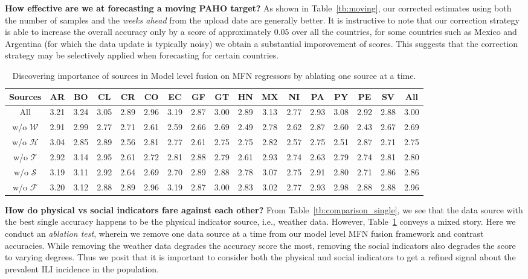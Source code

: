 {\noindent \textbf{How effective are we at forecasting a moving PAHO target?}} 
As shown in Table~\ref{tb:moving}, 
our
corrected estimates 
using both the number of samples and 
the {\it weeks ahead} from the upload date are generally better. It is instructive to note that
our correction strategy is
able to increase the overall accuracy only by a score of approximately 0.05 over all the countries, 
for some countries such as Mexico and Argentina (for which the data update is typically noisy) we obtain 
a substantial imporovement of scores. This suggests that the correction strategy may be selectively applied 
when forecasting for certain countries. 


\begin{table}[tb!]
  \scriptsize
  \centering
  \caption{\label{tb:Ablation} Discovering importance of sources in Model level fusion on MFN 
  regressors by ablating one source at a time.}
\vspace{-1em}
\begin{tabular}{|*{17}{c|}}
\hline
Sources & AR & BO & CL & CR & CO & EC & GF & GT & HN & MX & NI & PA & PY & PE & SV & All\\
\hline 
\hline
All               & 3.21& 3.24& 3.05& 2.89& 2.96& 3.19& 2.87& 3.00& 2.89& 3.13& 2.77& 2.93& 3.08& 2.92& 2.88& 3.00\\
w/o $\mathcal{W}$ & 2.91& 2.99& 2.77& 2.71& 2.61& 2.59& 2.66& 2.69& 2.49& 2.78& 2.62& 2.87& 2.60& 2.43& 2.67& 2.69  \\
w/o $\mathcal{H}$ & 3.04& 2.85& 2.89& 2.56& 2.81& 2.77& 2.61& 2.75& 2.75& 2.82& 2.57& 2.75& 2.51& 2.87& 2.71& 2.75  \\
w/o $\mathcal{T}$ & 2.92& 3.14& 2.95& 2.61& 2.72& 2.81& 2.88& 2.79& 2.61& 2.93& 2.74& 2.63& 2.79& 2.74& 2.81& 2.80  \\
w/o $\mathcal{S}$ & 3.19& 3.11& 2.92& 2.64& 2.69& 2.70& 2.89& 2.88& 2.78& 3.07& 2.75& 2.91& 2.80& 2.71& 2.86& 2.86  \\
w/o $\mathcal{F}$ & 3.20& 3.12& 2.88& 2.89& 2.96& 3.19& 2.87& 3.00& 2.83& 3.02& 2.77& 2.93& 2.98& 2.88& 2.88& 2.96  \\
\hline
\end{tabular}
\end{table}

{\noindent \textbf{How do physical vs social indicators fare against each other?}} 
From Table~\ref{tb:comparison_single}, we 
see that the data source with the best single accuracy happens to be the physical indicator source, i.e.,
weather data. However, Table~\ref{tb:Ablation} conveys a mixed story. Here we conduct an {\it ablation test},
wherein we remove one data source at a time from our model level MFN fusion framework and contrast accuracies.
While removing the weather data degrades the accuracy score the most, removing the social indicators also degrades
the score to varying degrees.
Thus we posit that it is important to consider both the physical 
and social indicators to get a refined signal about the prevalent ILI incidence in the population.

